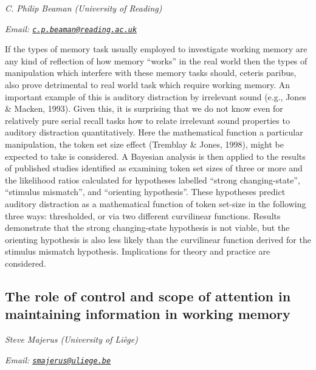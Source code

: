 \documentclass[
  12pt,
]{book}
\begin{document}
\emph{C. Philip Beaman (University of Reading)}

\emph{Email: \href{mailto:c.p.beaman@reading.ac.uk}{\nolinkurl{c.p.beaman@reading.ac.uk}}}

If the types of memory task usually employed to investigate working memory are any kind of reflection of how memory ``works'' in the real world then the types of manipulation which interfere with these memory tasks should, ceteris paribus, also prove detrimental to real world task which require working memory. An important example of this is auditory distraction by irrelevant sound (e.g., Jones \& Macken, 1993). Given this, it is surprising that we do not know even for relatively pure serial recall tasks how to relate irrelevant sound properties to auditory distraction quantitatively. Here the mathematical function a particular manipulation, the token set size effect (Tremblay \& Jones, 1998), might be expected to take is considered. A Bayesian analysis is then applied to the results of published studies identified as examining token set sizes of three or more and the likelihood ratios calculated for hypotheses labelled ``strong changing-state'', ``stimulus mismatch'', and ``orienting hypothesis''. These hypotheses predict auditory distraction as a mathematical function of token set-size in the following three ways: thresholded, or via two different curvilinear functions. Results demonstrate that the strong changing-state hypothesis is not viable, but the orienting hypothesis is also less likely than the curvilinear function derived for the stimulus mismatch hypothesis. Implications for theory and practice are considered.

\hypertarget{the-role-of-control-and-scope-of-attention-in-maintaining-information-in-working-memory}{%
\subsection{The role of control and scope of attention in maintaining information in working memory}\label{the-role-of-control-and-scope-of-attention-in-maintaining-information-in-working-memory}}

\emph{Steve Majerus (University of Liège)}

\emph{Email: \href{mailto:smajerus@uliege.be}{\nolinkurl{smajerus@uliege.be}}}
\end{document}

